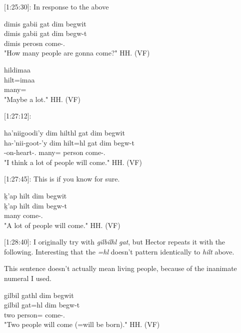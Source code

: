 [1:25:30]: In response to the above

\begin{exe}
    \ex
    \begin{xlist}
        \item \glll
        dimis g̱abii gat dim begwit \\
        dimis gabii gat dim begw-t\\
        dimis \Cnt{} perosn \Prosp{} come-\Tsg{}.\Ii{} \\
        \glt "How many people are gonna come?" \hfill HH.\ElicitationDate{} (VF)
        \item \glll
        hildimaa \\
        hilt=imaa \\
        many=\Epis{} \\
        \glt "Maybe a lot." \hfill HH.\ElicitationDate{} (VF)
    \end{xlist}
\end{exe}

[1:27:12]: 

\begin{exe}
    \ex \glll
    ha'niig̱oodi'y dim hilthl gat dim begwit \\
    ha-'nii-g̱oot-'y dim hilt=hl gat dim begw-t\\
    \Ins{}-on-heart-\Fsg{}.\Ii{} \Prosp{} many=\Cn{} person \Prosp{} come-\Tsg{}.\Ii{} \\
    \glt "I think a lot of people will come." \hfill HH.\ElicitationDate{} (VF)
\end{exe}

[1:27:45]: This is if you know for sure.

\begin{exe}
    \ex \glll
    ḵ'ap hilt dim begwit \\
    ḵ'ap hilt dim begw-t\\
    \Verum{} many \Prosp{} come-\Tsg{}.\Ii{} \\
    \glt "A lot of people will come." \hfill HH.\ElicitationDate{} (VF)
\end{exe}

[1:28:40]: I originally try with \textit{gilbilhl gat}, but Hector repeats it with the following. Interesting that the \textit{=hl} doesn't pattern identically to \textit{hilt} above.

This sentence doesn't actually mean living people, because of the inanimate numeral I used. 

\begin{exe}
    \ex \glll
    gilbil gathl dim begwit \\
    gilbil gat=hl dim begw-t \\
    two person=\Cn{} \Prosp{} come-\Tsg{}.\Ii{} \\
    \glt "Two people will come (=will be born)." \hfill HH.\ElicitationDate{} (VF)
\end{exe}

